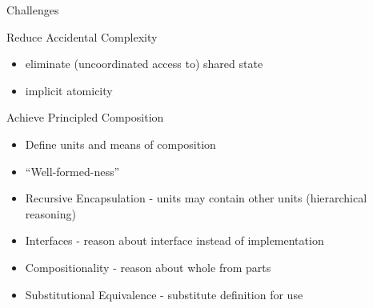 \documentclass{beamer}
\begin{document}
\begin{frame}{Challenges}

  \begin{block}{Reduce Accidental Complexity}
    \begin{itemize}
    \item eliminate (uncoordinated access to) shared state
    \item implicit atomicity
    \end{itemize}
  \end{block}

  \begin{block}{Achieve Principled Composition}
    \begin{itemize}
    \item Define units and means of composition
    \item ``Well-formed-ness''
    \item Recursive Encapsulation - units may contain other units (hierarchical reasoning)
    \item Interfaces - reason about interface instead of implementation
    \item Compositionality - reason about whole from parts
    \item Substitutional Equivalence - substitute definition for use
    \end{itemize}
  \end{block}
\end{frame}







\end{document}
